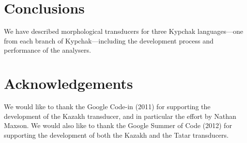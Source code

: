 \documentclass[a4paper,11pt,twocolumn]{article}
\begin{document}
\section{Conclusions}

We have described morphological transducers for three Kypchak languages---one from each branch of Kypchak---including the development process and performance of the analysers.

\section*{Acknowledgements}

We would like to thank the Google Code-in (2011) for supporting the development 
of the Kazakh transducer, and in particular the effort by Nathan Maxson. We 
would also like to thank the Google Summer of Code (2012) for supporting the 
development of both the Kazakh and the Tatar transducers. 



\end{document}
